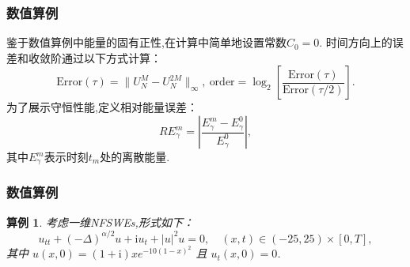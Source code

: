 \documentclass[aspectratio=169]{beamer}
\newtheorem{myexample}{算例}[section] %
\numberwithin{theorem}{section} %
\numberwithin{equation}{section}%
\numberwithin{figure}{section}%
\numberwithin{table}{section}%
\begin{document}
\begin{frame}\frametitle{数值算例}
	鉴于数值算例中能量的固有正性,在计算中简单地设置常数$C_0=0$.
	时间方向上的误差和收敛阶通过以下方式计算：
	\begin{equation}
		\text{Error}(\tau) = \|U_{N}^{M} - U_{N}^{2 M}\|_{\infty},~\text{order} = \log_{2}\left[\frac{\text{Error}(\tau)}{\text{Error}(\tau / 2)}\right].\label{eq_SAVRRK:104}
	\end{equation}
	为了展示守恒性能,定义相对能量误差：
	\begin{equation}\label{eq_SAVRRK:105}
		R E_{\gamma}^{m} = \left|\frac{E_{\gamma}^{m} - E_{\gamma}^{0}}{E_{\gamma}^{0}}\right|,
	\end{equation}
	其中$E_{\gamma}^{m}$表示时刻$t_m$处的离散能量.
\end{frame}
\begin{frame}\frametitle{数值算例}
		\begin{myexample}\label{exp_SAVRRK:1}
			考虑一维NFSWEs,形式如下\cite{ranLinearlyImplicitConservative2016}：
			\begin{equation}\label{eq_SAVRRK:108}
				u_{t t}+(-\Delta)^{\alpha / 2} u+\mathrm{i}u_t+|u|^2 u=0, \quad (x,t)\in  (-25, 25)\times[0, T],
			\end{equation}
			其中 $u(x, 0)=(1+\mathrm{i}) x e^{-10(1-x)^2}$ 且 $u_t(x, 0)=0$.
			\end{myexample}	
\end{frame}
\end{document}
